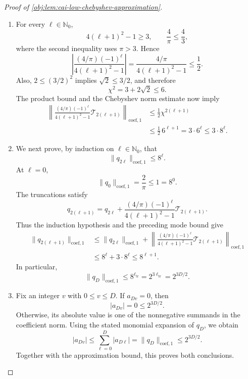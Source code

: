 \begin{proof}[Proof of \cref{obj:lem:cai-low-chebyshev-approximation}]
\begin{enumerate}
\item For every \(\ell\in\mathbb N_0\),
\[
4(\ell+1)^2-1\ge3,\qquad
\frac4\pi\le\frac43,
\]
where the second inequality uses \(\pi>3\). Hence
\[
\left|
 \frac{(4/\pi)(-1)^\ell}{4(\ell+1)^2-1}
\right|
=\frac{4/\pi}{4(\ell+1)^2-1}
\le\frac12.
\]
Also, \(2\le(3/2)^2\) implies \(\sqrt2\le3/2\), and therefore
\[
\chi^2=3+2\sqrt2\le6.
\]
The product bound and the Chebyshev norm estimate now imply
\[
\begin{aligned}
\left\|
 \frac{(4/\pi)(-1)^\ell}{4(\ell+1)^2-1}
 \mathcal T_{2(\ell+1)}
\right\|_{\mathrm{coef},1}
&\le\frac12\chi^{2(\ell+1)}\\
&\le\frac12\,6^{\ell+1}
=3\cdot6^\ell
\le3\cdot8^\ell.
\end{aligned}
\]

\item We next prove, by induction on \(\ell\in\mathbb N_0\), that
\[
\|q_{2\ell}\|_{\mathrm{coef},1}\le8^\ell.
\]
At \(\ell=0\),
\[
\|q_0\|_{\mathrm{coef},1}=\frac2\pi\le1=8^0.
\]
The truncations satisfy
\[
q_{2(\ell+1)}
=q_{2\ell}
+\frac{(4/\pi)(-1)^\ell}{4(\ell+1)^2-1}
 \mathcal T_{2(\ell+1)}.
\]
Thus the induction hypothesis and the preceding mode bound give
\[
\begin{aligned}
\|q_{2(\ell+1)}\|_{\mathrm{coef},1}
&\le\|q_{2\ell}\|_{\mathrm{coef},1}
+\left\|
 \frac{(4/\pi)(-1)^\ell}{4(\ell+1)^2-1}
 \mathcal T_{2(\ell+1)}
 \right\|_{\mathrm{coef},1}\\
&\le8^\ell+3\cdot8^\ell
\le8^{\ell+1}.
\end{aligned}
\]
In particular,
\[
\|q_D\|_{\mathrm{coef},1}
\le8^{\ell_{\mathrm{tr}}}
=2^{3\ell_{\mathrm{tr}}}
=2^{3D/2}.
\]

\item Fix an integer \(v\) with \(0\le v\le D\). If \(a_{Dv}=0\), then
\[
|a_{Dv}|=0\le2^{3D/2}.
\]
Otherwise, its absolute value is one of the nonnegative summands in the coefficient norm. Using the stated monomial expansion of \(q_D\), we obtain
\[
|a_{Dv}|
\le\sum_{\ell=0}^{D}|a_{D\ell}|
=\|q_D\|_{\mathrm{coef},1}
\le2^{3D/2}.
\]
Together with the approximation bound, this proves both conclusions.
\end{enumerate}
\end{proof}

